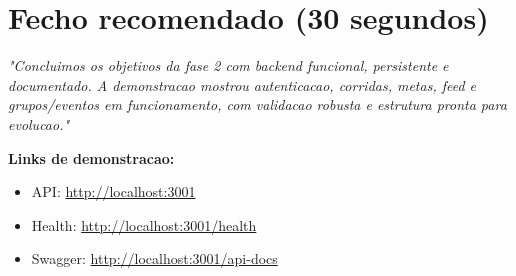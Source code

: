 \documentclass[11pt,a4paper]{article}
\begin{document}
\section{Fecho recomendado (30 segundos)}

\textit{"Concluimos os objetivos da fase 2 com backend funcional, persistente e documentado. A demonstracao mostrou autenticacao, corridas, metas, feed e grupos/eventos em funcionamento, com validacao robusta e estrutura pronta para evolucao."}

\vfill
\textbf{Links de demonstracao:}\
\begin{itemize}
  \item API: \url{http://localhost:3001}
  \item Health: \url{http://localhost:3001/health}
  \item Swagger: \url{http://localhost:3001/api-docs}
\end{itemize}
\end{document}
